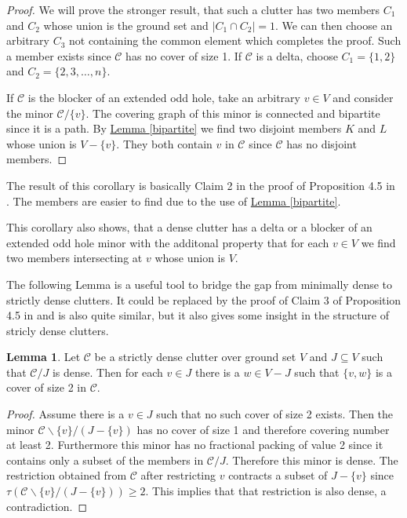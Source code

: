 \documentclass[a4paper, 12pt]{scrbook}
\theoremstyle{definition}
\newtheorem{lemma}[theorem]{Lemma}
\begin{document}
   \begin{proof}
       We will prove the stronger result, that such a clutter has two members $C_1$ and $C_2$ whose union is the ground set and $|C_1 \cap C_2|=1$.
       We can then choose an arbitrary $C_3$ not containing the common element which completes the proof.
       Such a member exists since $\mathcal{C}$ has no cover of size 1.
       If $\mathcal{C}$ is a delta, choose $C_1=\{1,2\}$ and $C_2=\{2,3,\ldots,n\}$.

       If $\mathcal{C}$ is the blocker of an extended odd hole, take an arbitrary $v \in V$ and consider the minor $\mathcal{C} / \{v\}$.
       The covering graph of this minor is connected and bipartite since it is a path.
       By \hyperref[bipartite]{Lemma \ref*{bipartite}} we find two disjoint members $K$ and $L$ whose union is $V-\{v\}$.
       They both contain $v$ in $\mathcal{C}$ since $\mathcal{C}$ has no disjoint members.
   \end{proof}

   The result of this corollary is basically Claim 2 in the proof of Proposition 4.5 in \cite{restrictions}. The members are easier to find due to the use of \hyperref[bipartite]{Lemma \ref*{bipartite}}.

   This corollary also shows, that a dense clutter has a delta or a blocker of an extended odd hole minor with the additonal property that for each $v \in V$ we find two members intersecting at $v$ whose union is $V$.

   The following Lemma is a useful tool to bridge the gap from minimally dense to strictly dense clutters. It could be replaced by the proof of Claim 3 of Proposition 4.5 in \cite{restrictions} and is also quite similar, but it also gives some insight in the structure of stricly dense clutters.
   \begin{lemma}\label{covers}
       Let $\mathcal{C}$ be a strictly dense clutter over ground set $V$ and $J \subseteq V$ such that $\mathcal{C} / J$ is dense.
       Then for each $v \in J$ there is a $w \in V-J$ such that $\{v,w\}$ is a cover of size 2 in $\mathcal{C}$.
   \end{lemma}

   \begin{proof}
       Assume there is a $v \in J$ such that no such cover of size 2 exists.
       Then the minor $\mathcal{C} \backslash \{v\} / (J-\{v\})$ has no cover of size 1 and therefore covering number at least 2.
       Furthermore this minor has no fractional packing of value 2 since it contains only a subset of the members in $\mathcal{C} / J$.
       Therefore this minor is dense.
       The restriction obtained from $\mathcal{C}$ after restricting $v$ contracts a subset of $J-\{v\}$ since $\tau(\mathcal{C} \backslash \{v\} / (J-\{v\}))\geq 2$.
       This implies that that restriction is also dense, a contradiction.
   \end{proof}
\end{document}
